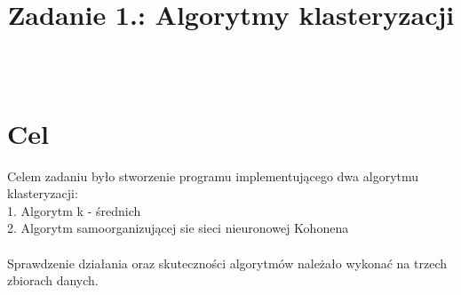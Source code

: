 \documentclass{classrep}
\author{%
  \studentinfo[216806@edu.p.lodz.pl]{Kamil Kowalewski}{216806}\\
  \studentinfo[216920@edu.p.lodz.pl]{Tomasz Witczak}{216920}%
}
\title{Zadanie 1.: Algorytmy klasteryzacji}
\begin{document}
\maketitle
\thispagestyle{fancyplain}

\section{Cel}
{Celem zadaniu było stworzenie programu implementującego dwa algorytmu klasteryzacji:\\
1. Algorytm k - średnich\\
2. Algorytm samoorganizującej sie sieci nieuronowej Kohonena\\\\
Sprawdzenie działania oraz skuteczności algorytmów należało wykonać na trzech zbiorach danych.
}
\end{document}
